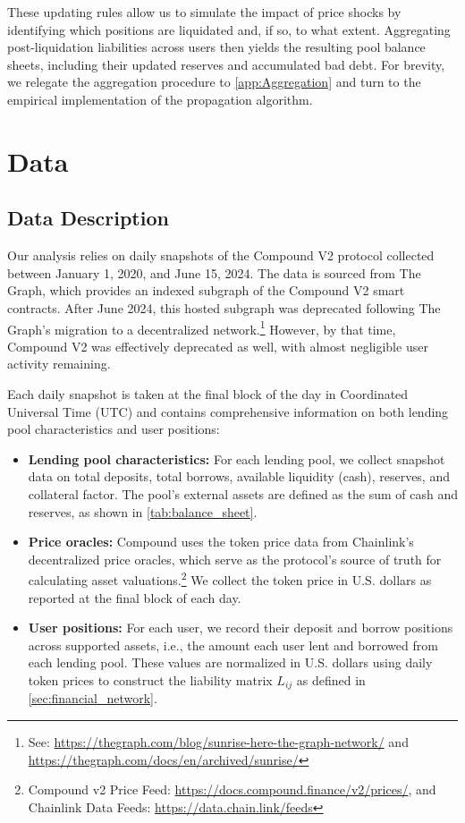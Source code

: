 \documentclass[a4paper,UKenglish,cleveref, autoref, thm-restate]{informs3}
\begin{document}
\medskip

These updating rules allow us to simulate the impact of price shocks by identifying which positions are liquidated and, if so, to what extent. Aggregating post-liquidation liabilities across users then yields the resulting pool balance sheets, including their updated reserves and accumulated bad debt. For brevity, we relegate the aggregation procedure to \ref{app:Aggregation} and turn to the empirical implementation of the propagation algorithm.


\section{Data}
\label{sec:data}

\medskip

\subsection{Data Description}

Our analysis relies on daily snapshots of the Compound V2 protocol collected between January 1, 2020, and June 15, 2024. The data is sourced from The Graph, which provides an indexed subgraph of the Compound V2 smart contracts. After June 2024, this hosted subgraph was deprecated following The Graph’s migration to a decentralized network.\footnote{See: \url{https://thegraph.com/blog/sunrise-here-the-graph-network/} and \url{https://thegraph.com/docs/en/archived/sunrise/}} However, by that time, Compound V2 was effectively deprecated as well, with almost negligible user activity remaining.

Each daily snapshot is taken at the final block of the day in Coordinated Universal Time (UTC) and contains comprehensive information on both lending pool characteristics and user positions:
\begin{itemize}
    \item \textbf{Lending pool characteristics:} For each lending pool, we collect snapshot data on total deposits, total borrows, available liquidity (cash), reserves, and collateral factor. The pool’s external assets are defined as the sum of cash and reserves, as shown in \autoref{tab:balance_sheet}.
    \item \textbf{Price oracles:} Compound uses the token price data from Chainlink's decentralized price oracles, which serve as the protocol’s source of truth for calculating asset valuations.\footnote{Compound v2 Price Feed:  \url{https://docs.compound.finance/v2/prices/}, and Chainlink Data Feeds: \url{https://data.chain.link/feeds}}
    We collect the token price in U.S. dollars as reported at the final block of each day.
    \item \textbf{User positions:} For each user, we record their deposit and borrow positions across supported assets, i.e., the amount each user lent and borrowed from each lending pool. These values are normalized in U.S. dollars using daily token prices to construct the liability matrix $L_{ij}$ as defined in \autoref{sec:financial_network}.
\end{itemize}
\end{document}
